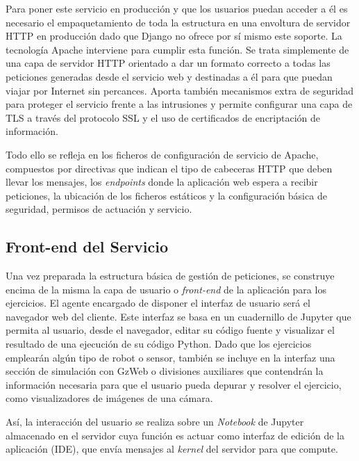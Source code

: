 Para poner este servicio en producción y que los usuarios puedan acceder a él es necesario el empaquetamiento de toda la estructura en una envoltura de servidor HTTP en producción dado que Django no ofrece por sí mismo este soporte. La tecnología Apache interviene para cumplir esta función. Se trata simplemente de una capa de servidor HTTP orientado a dar un formato correcto a todas las peticiones generadas desde el servicio web y destinadas a él para que puedan viajar por Internet sin percances. Aporta también mecanismos extra de seguridad para proteger el servicio frente a las intrusiones y permite configurar una capa de TLS a través del protocolo SSL y el uso de certificados de encriptación de información.

Todo ello se refleja en los ficheros de configuración de servicio de Apache, compuestos por directivas que indican el tipo de cabeceras HTTP que deben llevar los mensajes, los \textit{endpoints} donde la aplicación web espera a recibir peticiones, la ubicación de los ficheros estáticos y la configuración básica de seguridad, permisos de actuación y servicio.

\subsection{Front-end del Servicio}

Una vez preparada la estructura básica de gestión de peticiones, se construye encima de la misma la capa de usuario o \textit{front-end} de la aplicación para los ejercicios. El agente encargado de disponer el interfaz de usuario será el navegador web del cliente. Este interfaz se basa en un cuadernillo de Jupyter que permita al usuario, desde el navegador, editar su código fuente y visualizar el resultado de una ejecución de su código Python. Dado que los ejercicios emplearán algún tipo de robot o sensor, también se incluye en la interfaz una sección de simulación con GzWeb o divisiones auxiliares que contendrán la información necesaria para que el usuario pueda depurar y resolver el ejercicio, como visualizadores de imágenes de una cámara.

Así, la interacción del usuario se realiza sobre un \textit{Notebook} de Jupyter almacenado en el servidor cuya función es actuar como interfaz de edición de la aplicación (IDE), que envía mensajes al \textit{kernel} del servidor para que compute.

